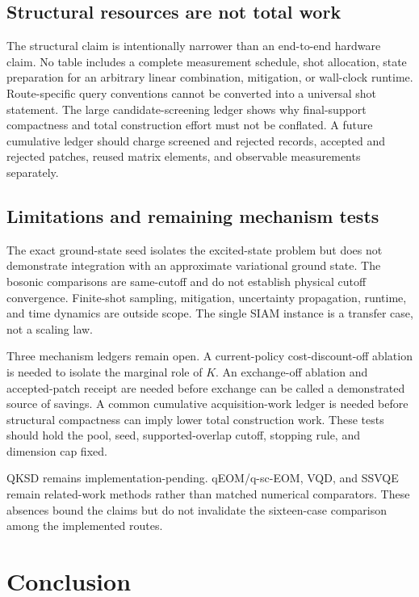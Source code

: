 \documentclass[
  reprint,
  amsmath,
  amssymb,
  aps,
  pra,
  nofootinbib,
  superscriptaddress,
  floatfix
]{revtex4-2}
\begin{document}
\subsection{Structural resources are not total work}

The structural claim is intentionally narrower than an end-to-end hardware
claim.  No table includes a complete measurement schedule, shot allocation,
state preparation for an arbitrary linear combination, mitigation, or
wall-clock runtime.  Route-specific query conventions cannot be converted
into a universal shot statement.  The large candidate-screening ledger shows
why final-support compactness and total construction effort must not be
conflated.  A future cumulative ledger should charge screened and rejected
records, accepted and rejected patches, reused matrix elements, and observable
measurements separately.

\subsection{Limitations and remaining mechanism tests}
\label{sec:limitations}

The exact ground-state seed isolates the excited-state problem but does not
demonstrate integration with an approximate variational ground state.  The
bosonic comparisons are same-cutoff and do not establish physical cutoff
convergence.  Finite-shot sampling, mitigation, uncertainty propagation,
runtime, and time dynamics are outside scope.  The single SIAM instance is a
transfer case, not a scaling law.

Three mechanism ledgers remain open.  A current-policy cost-discount-off
ablation is needed to isolate the marginal role of $K$.  An exchange-off
ablation and accepted-patch receipt are needed before exchange can be called a
demonstrated source of savings.  A common cumulative acquisition-work ledger
is needed before structural compactness can imply lower total construction
work.  These tests should hold the pool, seed, supported-overlap cutoff,
stopping rule, and dimension cap fixed.

QKSD remains implementation-pending.  qEOM/q-sc-EOM, VQD, and SSVQE remain
related-work methods rather than matched numerical comparators.  These
absences bound the claims but do not invalidate the sixteen-case comparison
among the implemented routes.

\section{Conclusion}
\label{sec:conclusion}
\end{document}
